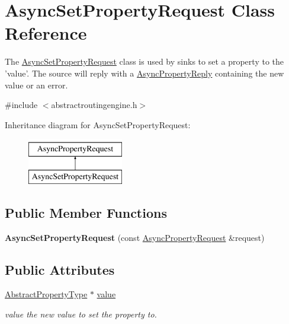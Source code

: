 \hypertarget{classAsyncSetPropertyRequest}{\section{Async\-Set\-Property\-Request Class Reference}
\label{classAsyncSetPropertyRequest}
}


The \hyperlink{classAsyncSetPropertyRequest}{Async\-Set\-Property\-Request} class is used by sinks to set a property to the 'value'. The source will reply with a \hyperlink{classAsyncPropertyReply}{Async\-Property\-Reply} containing the new value or an error.  




{\ttfamily \#include $<$abstractroutingengine.\-h$>$}

Inheritance diagram for Async\-Set\-Property\-Request\-:\begin{figure}[H]
\begin{center}
\leavevmode
\includegraphics[height=2.000000cm]{classAsyncSetPropertyRequest}
\end{center}
\end{figure}
\subsection*{Public Member Functions}
\begin{DoxyCompactItemize}
\item 
\hypertarget{classAsyncSetPropertyRequest_aa2fa61c815aa1950511eb88cc29f655a}{{\bfseries Async\-Set\-Property\-Request} (const \hyperlink{classAsyncPropertyRequest}{Async\-Property\-Request} \&request)}\label{classAsyncSetPropertyRequest_aa2fa61c815aa1950511eb88cc29f655a}

\end{DoxyCompactItemize}
\subsection*{Public Attributes}
\begin{DoxyCompactItemize}
\item 
\hypertarget{classAsyncSetPropertyRequest_a5c1c8d5b4a6765ce2acab9a3aca9c9a6}{\hyperlink{classAbstractPropertyType}{Abstract\-Property\-Type} $\ast$ \hyperlink{classAsyncSetPropertyRequest_a5c1c8d5b4a6765ce2acab9a3aca9c9a6}{value}}\label{classAsyncSetPropertyRequest_a5c1c8d5b4a6765ce2acab9a3aca9c9a6}

\begin{DoxyCompactList}\small\item\em value the new value to set the property to. \end{DoxyCompactList}\end{DoxyCompactItemize}


